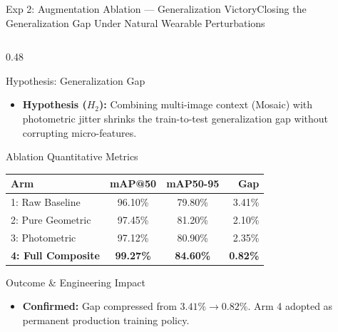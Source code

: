 \begin{frame}{Exp 2: Augmentation Ablation --- Generalization Victory}{Closing the Generalization Gap Under Natural Wearable Perturbations}
    \begin{columns}[c]
        \begin{column}{0.48\textwidth}
            \begin{techblock}{Hypothesis: Generalization Gap}
                \scriptsize
                \begin{itemize}\setlength{\itemsep}{2pt}
                    \item \textbf{Hypothesis ($H_2$):} Combining multi-image context (Mosaic) with photometric jitter shrinks the train-to-test generalization gap without corrupting micro-features.
                \end{itemize}
            \end{techblock}
            
            \vspace{0.06cm}
            \begin{card}{Ablation Quantitative Metrics}
                \centering
                \tiny
                \renewcommand{\arraystretch}{1.05}
                \begin{tabular}{l c c r}
                    \toprule
                    \textbf{Arm} & \textbf{mAP@50} & \textbf{mAP50-95} & \textbf{Gap} \\
                    \midrule
                    1: Raw Baseline & 96.10\% & 79.80\% & 3.41\% \\
                    2: Pure Geometric & 97.45\% & 81.20\% & 2.10\% \\
                    3: Photometric & 97.12\% & 80.90\% & 2.35\% \\
                    \textbf{4: Full Composite} & \textbf{99.27\%} & \textbf{84.60\%} & \textbf{0.82\%} \\
                    \bottomrule
                \end{tabular}
            \end{card}
            
            \vspace{0.06cm}
            \begin{alertblockcustom}{Outcome \& Engineering Impact}
                \scriptsize
                \begin{itemize}\setlength{\itemsep}{1.5pt}
                    \item \textbf{Confirmed:} Gap compressed from $3.41\% \to 0.82\%$. Arm 4 adopted as permanent production training policy.
                \end{itemize}
            \end{alertblockcustom}
        \end{column}
        

\end{columns}
\end{frame}
